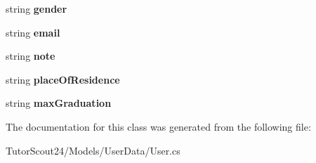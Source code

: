 \begin{DoxyCompactItemize}
\mbox{\label{class_tutor_scout24_1_1_models_1_1_user_data_1_1_user_ad39ce3c2c7ec919510b50d1e823d6427}} 
string {\bfseries gender}
\item 
\mbox{\label{class_tutor_scout24_1_1_models_1_1_user_data_1_1_user_a63c3259a3af3605c75dfc73dc52a489c}} 
string {\bfseries email}
\item 
\mbox{\label{class_tutor_scout24_1_1_models_1_1_user_data_1_1_user_aae7de2be72f16d6f458fa2e6a4b5d007}} 
string {\bfseries note}
\item 
\mbox{\label{class_tutor_scout24_1_1_models_1_1_user_data_1_1_user_a38c02b87b262ec933dd1bc75b92e390e}} 
string {\bfseries place\+Of\+Residence}
\item 
\mbox{\label{class_tutor_scout24_1_1_models_1_1_user_data_1_1_user_ab1ca60a7fabbe9b828df7b36c06d89d1}} 
string {\bfseries max\+Graduation}
\end{DoxyCompactItemize}


The documentation for this class was generated from the following file\+:\begin{DoxyCompactItemize}
\item 
Tutor\+Scout24/\+Models/\+User\+Data/User.\+cs\end{DoxyCompactItemize}
